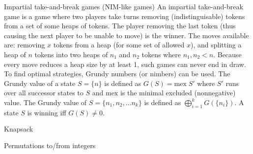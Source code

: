 \categorycontents{}



\begin{algorithm}{Impartial take-and-break games (NIM-like games)}
\desc
An impartial take-and-break game is a game where two players take
turns removing (indistinguisable) tokens from a set of some heaps of
tokens.  The player removing the last token (thus causing the next
player to be unable to move) is the winner.  The moves available are:
removing $x$ tokens from a heap (for some set of allowed $x$), and
splitting a heap of $n$ tokens into two heaps of $n_1$ and $n_2$
tokens where $n_1, n_2 < n$.  Because every move reduces a heap size
by at least 1, such games can never end in draw.  To find optimal
strategies, Grundy numbers (or nimbers) can be used.  The Grundy value
of a state $S = \{n\}$ is defined as $G(S) =
\mathrm{mex}\;S'$ where $S'$ runs over all successor states to $S$ and
$\mathrm{mex}$ is the minimal excluded (nonnegative) value.  The
Grundy value of $S =
\{n_1, n_2, \ldots n_k\}$ is defined as $\bigoplus_{i=1}^{k}
G(\{n_i\})$.  A state $S$ is winning iff $G(S) \ne 0$.

\end{algorithm}


\begin{algorithm}{Knapsack}
\end{algorithm}


\begin{algorithm}{Permutations to/from integers}
\end{algorithm}



